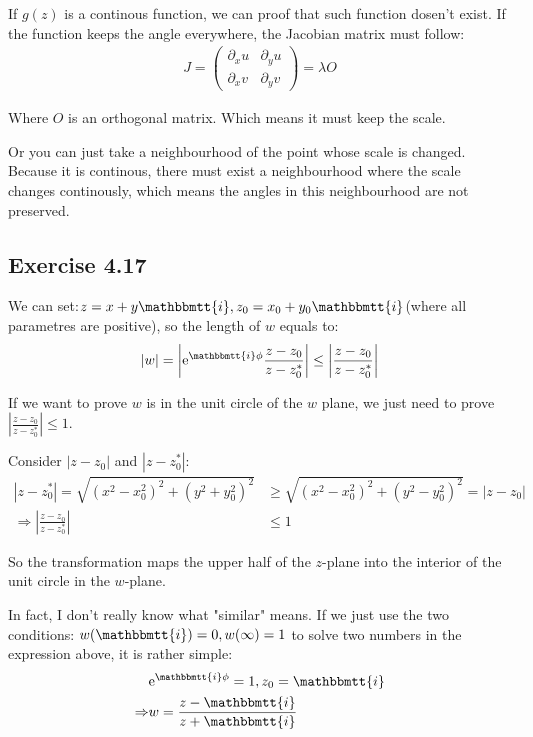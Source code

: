 \documentclass[]{ctexart}
\newcommand{\mi}{\mathbbmtt{i}}
\newcommand{\pa}{\partial}
\newcommand{\me}{\mathrm{e}}
\begin{document}
		If $g(z)$ is a continous function, we can proof that such function dosen't exist. If the function keeps the angle everywhere, the Jacobian matrix must follow:
			\begin{equation*}
			\begin{aligned}
				J=
				\begin{pmatrix}
					\pa_xu & \pa_yu\\
					\pa_xv & \pa_yv
				\end{pmatrix}
				=\lambda O
			\end{aligned}
			\end{equation*}
		
		Where $O$ is an orthogonal matrix. Which means it must keep the scale. 
		
		Or you can just take a neighbourhood of the point whose scale is changed. Because it is continous, there must exist a neighbourhood where the scale changes continously, which means the angles in this neighbourhood are not preserved. 
		
	\subsection{Exercise 4.17}
		We can set:$z=x+y\mi, z_0=x_0+y_0\mi$(where all parametres are positive), so the length of $w$ equals to:
			\begin{equation*}
			\begin{aligned}
				|w|=\left|\me ^{\mi \phi }\frac{z-z_0}{z-z_0^*}\right|\leq \left|\frac{z-z_0}{z-z_0^*}\right|
			\end{aligned}
			\end{equation*}
			
		If we want to prove $w$ is in the unit circle of the $w$ plane, we just need to prove $\left|\frac{z-z_0}{z-z_0^*}\right|\leq 1$.
		
		Consider $|z-z_0|$ and $|z-z_0^*|$:
			\begin{equation*}
			\begin{aligned}
				|z-z_0^*|=\sqrt{(x^2-x_0^2)^2+(y^2+y_0^2)^2}&\geq \sqrt{(x^2-x_0^2)^2+(y^2-y_0^2)^2}=|z-z_0|\\
				\Rightarrow \left|\frac{z-z_0}{z-z_0^*}\right|&\leq 1
			\end{aligned}
			\end{equation*}
			
		So the transformation maps the upper half of the $ z $-plane into the interior of the unit circle in the $ w $-plane.
		
		In fact, I don't really know what "similar" means. If we just use the two conditions:  $w(\mi)=0,w(\infty)=1$ to solve two numbers in the expression above, it is rather simple:
			\begin{equation*}
			\begin{aligned}
				&\me ^{\mi \phi}=1, z_0=\mi \\
				\Rightarrow &w=\frac{z-\mi}{z+\mi}
			\end{aligned}
			\end{equation*}
			
\end{document}
